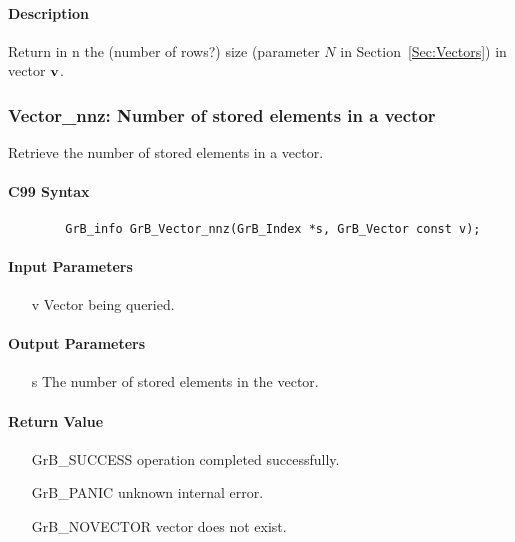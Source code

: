 \paragraph{Description}

Return in {\sf n} the (number of rows?) size (parameter $N$ in Section~\ref{Sec:Vectors}) in vector ${\bf v}$.

\subsubsection{{\sf Vector\_nnz}: Number of stored elements in a vector}

Retrieve the number of stored elements in a vector.

\paragraph{C99 Syntax}

\begin{verbatim}
        GrB_info GrB_Vector_nnz(GrB_Index *s, GrB_Vector const v);
\end{verbatim}

\paragraph{Input Parameters}

\begin{itemize}[leftmargin=1.1in]
    \item[{\sf v}] Vector being queried.
\end{itemize}

\paragraph{Output Parameters}
\begin{itemize}[leftmargin=1.1in]
    \item[{\sf s}] The number of stored elements in the vector.
\end{itemize}

\paragraph{Return Value}

\begin{itemize}[leftmargin=2.1in]
\item[{\sf GrB\_SUCCESS}]   operation completed successfully.
\item[{\sf GrB\_PANIC}]     unknown internal error.
\item[{\sf GrB\_NOVECTOR}]  vector does not exist.
\end{itemize}

